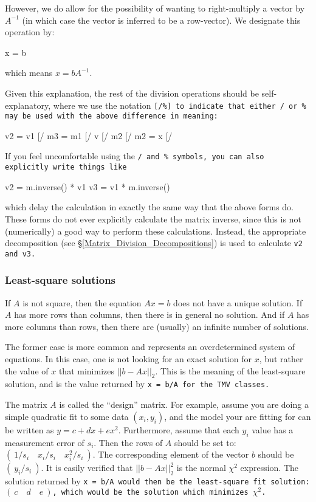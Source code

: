 However, we do allow for the possibility of wanting to right-multiply a vector
by $A^{-1}$ (in which case the vector is inferred to be a row-vector).  We designate
this operation by:
\begin{tmvcode}
x = b %
\end{tmvcode}
which means $x = b A^{-1}$.

Given this explanation, the rest of the division operations should be self-explanatory,
where we use the notation \tt{[/\%]} to indicate that either \tt{/} or \tt{\%} may
be used with the above difference in meaning:
\begin{tmvcode}
v2 = v1 [/%
m3 = m1 [/%
v [/%
m2 [/%
m2 = x [/%
\end{tmvcode}

If you feel uncomfortable using the \tt{/} and \tt{\%} symbols,
you can also explicitly write things like
\begin{tmvcode}
v2 = m.inverse() * v1
v3 = v1 * m.inverse()
\end{tmvcode}
which delay the calculation in exactly the same way that the above forms do.  
These forms
do not ever explicitly calculate the matrix inverse, since this is not (numerically) a
good way to perform these calculations.  Instead, the appropriate decomposition 
(see \S\ref{Matrix_Division_Decompositions})
is used to calculate \tt{v2} and \tt{v3}.

\subsubsection{Least-square solutions}
\label{Matrix_Division_Leastsquare}

If $A$ is not square, then the equation $A x = b$ does not have a unique solution.
If $A$ has more rows than columns, then there is in general no solution.
And if $A$ has more columns than rows, then there are (usually) an infinite 
number of solutions.  

The former case is more common and represents an overdetermined system of 
equations.  In this case, one is not looking for an exact solution
for $x$, but rather the value of $x$ that minimizes $||b - A x||_2$.  This is the 
meaning of the least-square
solution, and is the value returned by \tt{x = b/A} for the TMV classes.  

The matrix $A$ is called the ``design'' matrix.  For example, assume you are doing
a simple quadratic fit to some data $(x_i,y_i)$, and the model your are fitting for
can be written as
$y = c + dx + ex^2$.  Furthermore, assume that each
$y_i$ value has a measurement error of $s_i$.  Then the rows of $A$ should
be set to: $( ~1/s_i \quad x_i/s_i \quad x_i^2/s_i ~ )$.  The corresponding
element of the vector $b$ should be $( ~ y_i/s_i ~ )$.  It is easily verified that
$||b-Ax||_2^2$ is the normal $\chi^2$ expression.
The solution returned by
\tt{x = b/A} would then be the least-square fit solution: $(~c \quad d \quad e~)$,
which would be the solution which minimizes $\chi^2$.

